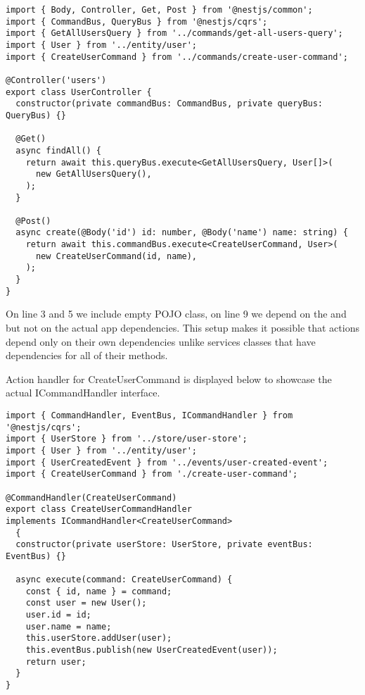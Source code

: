 \begin{verbatim}
import { Body, Controller, Get, Post } from '@nestjs/common';
import { CommandBus, QueryBus } from '@nestjs/cqrs';
import { GetAllUsersQuery } from '../commands/get-all-users-query';
import { User } from '../entity/user';
import { CreateUserCommand } from '../commands/create-user-command';

@Controller('users')
export class UserController {
  constructor(private commandBus: CommandBus, private queryBus: QueryBus) {}

  @Get()
  async findAll() {
    return await this.queryBus.execute<GetAllUsersQuery, User[]>(
      new GetAllUsersQuery(),
    );
  }

  @Post()
  async create(@Body('id') id: number, @Body('name') name: string) {
    return await this.commandBus.execute<CreateUserCommand, User>(
      new CreateUserCommand(id, name),
    );
  }
}

\end{verbatim}

On line 3 and 5 we include empty POJO class, on line 9 we depend on the  and 
but not on the actual app dependencies.
This setup makes it possible that actions depend only on their own dependencies unlike services classes that
have dependencies for all of their methods.

Action handler for CreateUserCommand is displayed below to showcase the actual ICommandHandler interface.

\begin{verbatim}
import { CommandHandler, EventBus, ICommandHandler } from '@nestjs/cqrs';
import { UserStore } from '../store/user-store';
import { User } from '../entity/user';
import { UserCreatedEvent } from '../events/user-created-event';
import { CreateUserCommand } from './create-user-command';

@CommandHandler(CreateUserCommand)
export class CreateUserCommandHandler
implements ICommandHandler<CreateUserCommand>
  {
  constructor(private userStore: UserStore, private eventBus: EventBus) {}

  async execute(command: CreateUserCommand) {
    const { id, name } = command;
    const user = new User();
    user.id = id;
    user.name = name;
    this.userStore.addUser(user);
    this.eventBus.publish(new UserCreatedEvent(user));
    return user;
  }
}
\end{verbatim}



